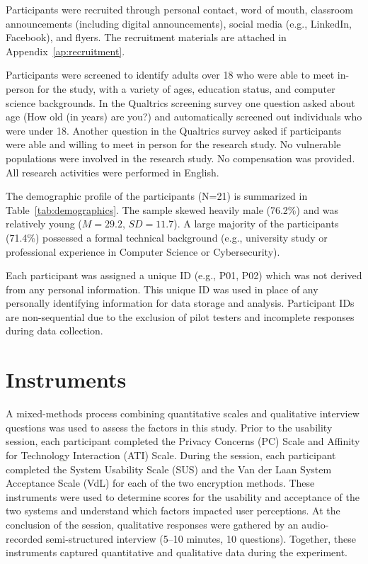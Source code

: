 Participants were recruited through personal contact, word of mouth, classroom announcements (including digital announcements), social media (e.g., LinkedIn\textregistered{}, Facebook), and flyers. The recruitment materials are attached in Appendix~\ref{ap:recruitment}.

Participants were screened to identify adults over 18 who were able to meet in-person for the study, with a variety of ages, education status, and computer science backgrounds. In the Qualtrics screening survey one question asked about age (How old (in years) are you?) and automatically screened out individuals who were under 18. Another question in the Qualtrics survey asked if participants were able and willing to meet in person for the research study. No vulnerable populations were involved in the research study. No compensation was provided. All research activities were performed in English.



The demographic profile of the participants (N=21) is summarized in Table~\ref{tab:demographics}. The sample skewed heavily male (76.2\%) and was relatively young ($M=29.2$, $SD=11.7$). A large majority of the participants (71.4\%) possessed a formal technical background (e.g., university study or professional experience in Computer Science or Cybersecurity).

Each participant was assigned a unique ID (e.g., P01, P02) which was not derived from any personal information. This unique ID was used in place of any personally identifying information for data storage and analysis. Participant IDs are non-sequential due to the exclusion of pilot testers and incomplete responses during data collection.

\section{Instruments}
\label{sec:instruments}

A mixed-methods process combining quantitative scales and qualitative interview questions was used to assess the factors in this study. Prior to the usability session, each participant completed the Privacy Concerns (PC) Scale and Affinity for Technology Interaction (ATI) Scale. During the session, each participant completed the System Usability Scale (SUS) and the Van der Laan System Acceptance Scale (VdL) for each of the two encryption methods. These instruments were used to determine scores for the usability and acceptance of the two systems and understand which factors impacted user perceptions. At the conclusion of the session, qualitative responses were gathered by an audio-recorded semi-structured interview (5--10 minutes, 10 questions). Together, these instruments captured quantitative and qualitative data during the experiment.

